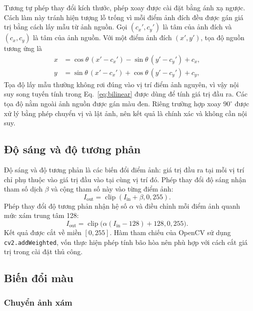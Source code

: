 \documentclass[12pt]{article}
\numberwithin{equation}{section}
\begin{document}
Tương tự phép thay đổi kích thước, phép xoay được cài đặt bằng ánh xạ ngược. Cách
làm này tránh hiện tượng lỗ trống vì mỗi điểm ảnh đích đều được gán giá trị bằng
cách lấy mẫu từ ảnh nguồn. Gọi $(c_x',c_y')$ là tâm của ảnh đích và $(c_x,c_y)$
là tâm của ảnh nguồn. Với một điểm ảnh đích $(x',y')$, tọa độ nguồn tương ứng là
\begin{equation}
\begin{aligned}
x &= \cos\theta\,(x'-c_x') - \sin\theta\,(y'-c_y') + c_x,\\
y &= \sin\theta\,(x'-c_x') + \cos\theta\,(y'-c_y') + c_y,
\end{aligned}
\label{eq:rotation}
\end{equation}
Tọa độ lấy mẫu thường không rơi đúng vào vị trí điểm ảnh nguyên, vì vậy nội suy
song tuyến tính trong Eq.~\eqref{eq:bilinear} được dùng để tính giá trị đầu ra.
Các tọa độ nằm ngoài ảnh nguồn được gán màu đen. Riêng trường hợp xoay
$90^\circ$ được xử lý bằng phép chuyển vị và lật ảnh, nên kết quả là chính xác
và không cần nội suy.

\subsection{Độ sáng và độ tương phản}

Độ sáng và độ tương phản là các biến đổi điểm ảnh: giá trị đầu ra tại mỗi vị trí
chỉ phụ thuộc vào giá trị đầu vào tại cùng vị trí đó. Phép thay đổi độ sáng nhận
tham số dịch $\beta$ và cộng tham số này vào từng điểm ảnh:
\begin{equation}
I_{\text{out}} = \operatorname{clip}(I_{\text{in}} + \beta, 0, 255).
\label{eq:brightness}
\end{equation}
Phép thay đổi độ tương phản nhận hệ số $\alpha$ và điều chỉnh mỗi điểm ảnh quanh
mức xám trung tâm 128:
\begin{equation}
I_{\text{out}} = \operatorname{clip}\big(\alpha(I_{\text{in}}-128)+128,0,255\big).
\label{eq:contrast}
\end{equation}
Kết quả được cắt về miền $[0,255]$. Hàm tham chiếu của OpenCV sử dụng
\texttt{cv2.addWeighted}, vốn thực hiện phép tính bão hòa nên phù hợp với cách
cắt giá trị trong cài đặt thủ công.

\subsection{Biến đổi màu}

\subsubsection{Chuyển ảnh xám}
\end{document}
